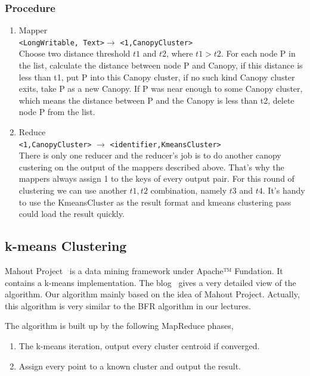 \documentclass[a4paper,11pt]{article}
\begin{document}
\subsubsection{Procedure}
\begin{enumerate}
  \item Mapper \\
      \verb|<LongWritable, Text>|$\rightarrow$ \verb|<1,CanopyCluster>|\\
      Choose two distance threshold $t1$ and $t2$, where $t1>t2$. For each  
      node P in the list, calculate the distance between node 
      P and Canopy, if this distance is less than t1, put P into this 
      Canopy cluster, if no such kind Canopy cluster exits, take P as a new 
      Canopy. If P was near enough to some Canopy cluster, which means the 
      distance   between P and the Canopy is less than t2, delete 
      node P from the list. 
  \item Reduce\\
    \verb|<1,CanopyCluster>|  $\rightarrow$   
    \verb|<identifier,KmeansCluster>| \\
     There is only one reducer and the reducer's job is to do another canopy 
     custering on the output of the mappers described above. That's why the 
     mappers always assign 1 to the keys of every output pair.
     For this round of clustering we can use another $t1,t2$ combination, 
     namely $t3$ and $t4$. 
     It's handy to use the KmeansCluster as the result format and kmeans 
     clustering pass could load the result quickly.
\end{enumerate}


\subsection{k-means Clustering}
Mahout Project~\cite{apache:mahout} is a data mining framework under Apache™
Fundation. It contains a k-means implementation. The blog~\cite{algo:kmeans3}
gives a very detailed view of the algorithm. Our algorithm mainly based on the
idea of Mahout Project. Actually, this algorithm is very similar to the BFR
algorithm in our lectures.

The algorithm is built up by the following MapReduce phases,
\begin{enumerate}
  \item The k-means iteration, output every cluster centroid if
  converged.  	
  \item Assign every point to a known cluster and output the result.
\end{enumerate}
\end{document}
